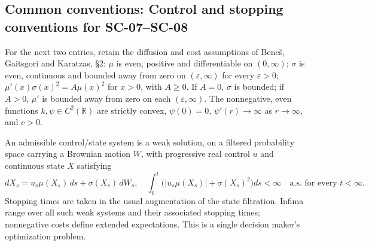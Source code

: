 \documentclass[11pt,a4paper]{article}
\newcommand{\R}{\mathbb R}
\begin{document}
\subsection*{Common conventions: Control and stopping conventions for SC-07--SC-08}

For the next two entries, retain the diffusion and cost assumptions of
Bene\v{s}, Gaitsgori and Karatzas, \S2: $\mu$ is even, positive and
differentiable on $(0,\infty)$; $\sigma$ is even, continuous and bounded
away from zero on $(\varepsilon,\infty)$ for every $\varepsilon>0$;
$\mu'(x)\sigma(x)^2=A\mu(x)^2$ for $x>0$, with $A\geq0$.
If $A=0$, $\sigma$ is bounded; if $A>0$, $\mu'$ is bounded away from
zero on each $(\varepsilon,\infty)$. The nonnegative, even functions
$k,\psi\in C^2(\R)$ are strictly convex, $\psi(0)=0$,
$\psi'(r)\to\infty$ as $r\to\infty$, and $c>0$.

An admissible control/state system is a weak solution, on a filtered
probability space carrying a Brownian motion $W$, with progressive real
control $u$ and continuous state $X$ satisfying
\[
 dX_s=u_s\mu(X_s)\,ds+\sigma(X_s)\,dW_s,
 \quad
 \int_0^t\bigl(|u_s\mu(X_s)|+\sigma(X_s)^2\bigr)ds<\infty
 \quad\text{a.s. for every }t<\infty.
\]
Stopping times are taken in the usual augmentation of the state
filtration. Infima range over all such weak systems and their associated
stopping times; nonnegative costs define extended expectations.
This is a single decision maker's optimization problem.
\end{document}
